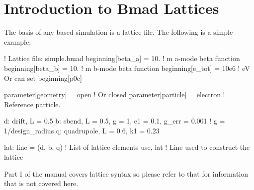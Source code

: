 \documentclass{hitec}
\newcommand{\Section}[1]{\section{#1}\vspace*{-1ex}}
\begin{document}
\Section{Introduction to Bmad Lattices}
\label{s:bmad.intro}

The basis of any \bmad based simulation is a lattice file. The following is a
simple example:
\begin{code}
! Lattice file: simple.bmad
beginning[beta_a] = 10.   ! m  a-mode beta function
beginning[beta_b] = 10.   ! m  b-mode beta function
beginning[e_tot] = 10e6   ! eV   Or can set beginning[p0c]

parameter[geometry] = open          ! Or closed
parameter[particle] = electron      ! Reference particle.

d: drift, L = 0.5
b: sbend, L = 0.5, g = 1, e1 = 0.1, g_err = 0.001   ! g = 1/design_radius
q: quadrupole, L = 0.6, k1 = 0.23

lat: line = (d, b, q)       ! List of lattice elements
use, lat                    ! Line used to construct the lattice
\end{code}
Part I of the \bmad manual covers lattice syntax so please refer to that for information that
is not covered here.
\end{document}
